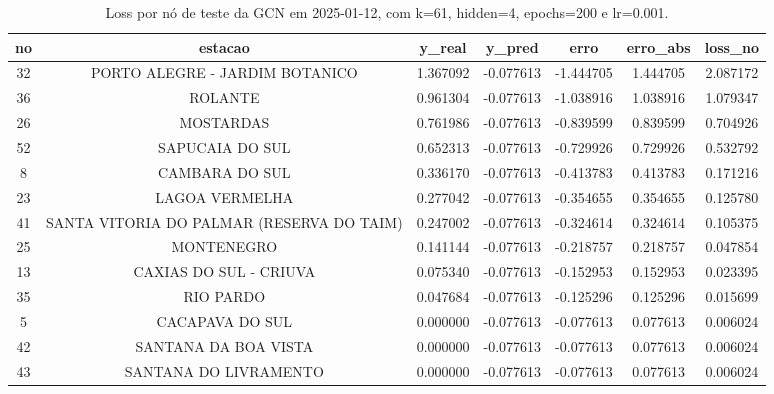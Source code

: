 \begin{table}[h]
\centering
\caption{Loss por nó de teste da GCN em 2025-01-12, com k=61, hidden=4, epochs=200 e lr=0.001.}
\label{tab:gcn_loss_nodes_k61_hidden4}
\begin{tabular}{ccccccc}
\toprule
no & estacao & y\_real & y\_pred & erro & erro\_abs & loss\_no \\
\midrule
32 & PORTO ALEGRE - JARDIM BOTANICO & 1.367092 & -0.077613 & -1.444705 & 1.444705 & 2.087172 \\
36 & ROLANTE & 0.961304 & -0.077613 & -1.038916 & 1.038916 & 1.079347 \\
26 & MOSTARDAS & 0.761986 & -0.077613 & -0.839599 & 0.839599 & 0.704926 \\
52 & SAPUCAIA DO SUL & 0.652313 & -0.077613 & -0.729926 & 0.729926 & 0.532792 \\
8 & CAMBARA DO SUL & 0.336170 & -0.077613 & -0.413783 & 0.413783 & 0.171216 \\
23 & LAGOA VERMELHA & 0.277042 & -0.077613 & -0.354655 & 0.354655 & 0.125780 \\
41 & SANTA VITORIA DO PALMAR (RESERVA DO TAIM) & 0.247002 & -0.077613 & -0.324614 & 0.324614 & 0.105375 \\
25 & MONTENEGRO & 0.141144 & -0.077613 & -0.218757 & 0.218757 & 0.047854 \\
13 & CAXIAS DO SUL - CRIUVA & 0.075340 & -0.077613 & -0.152953 & 0.152953 & 0.023395 \\
35 & RIO PARDO & 0.047684 & -0.077613 & -0.125296 & 0.125296 & 0.015699 \\
5 & CACAPAVA DO SUL & 0.000000 & -0.077613 & -0.077613 & 0.077613 & 0.006024 \\
42 & SANTANA DA BOA VISTA & 0.000000 & -0.077613 & -0.077613 & 0.077613 & 0.006024 \\
43 & SANTANA DO LIVRAMENTO & 0.000000 & -0.077613 & -0.077613 & 0.077613 & 0.006024 \\
\bottomrule
\end{tabular}
\end{table}
